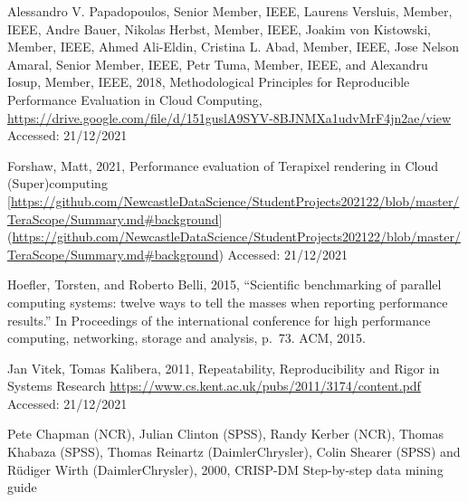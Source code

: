 \documentclass[
  twocolumn]{article}
\begin{document}
Alessandro V. Papadopoulos, Senior Member, IEEE, Laurens Versluis,
Member, IEEE, Andre Bauer, Nikolas Herbst, Member, IEEE, Joakim von
Kistowski, Member, IEEE, Ahmed Ali-Eldin, Cristina L. Abad, Member,
IEEE, Jose Nelson Amaral, Senior Member, IEEE, Petr Tuma, Member, IEEE,
and Alexandru Iosup, Member, IEEE, 2018, Methodological Principles for
Reproducible Performance Evaluation in Cloud Computing,
\url{https://drive.google.com/file/d/151guslA9SYV-8BJNMXa1udvMrF4jn2ae/view}
Accessed: 21/12/2021

Forshaw, Matt, 2021, Performance evaluation of Terapixel rendering in
Cloud (Super)computing
{[}\url{https://github.com/NewcastleDataScience/StudentProjects202122/blob/master/TeraScope/Summary.md\#background}{]}
(\url{https://github.com/NewcastleDataScience/StudentProjects202122/blob/master/TeraScope/Summary.md\#background})
Accessed: 21/12/2021

Hoefler, Torsten, and Roberto Belli, 2015, ``Scientific benchmarking of
parallel computing systems: twelve ways to tell the masses when
reporting performance results.'' In Proceedings of the international
conference for high performance computing, networking, storage and
analysis, p.~73. ACM, 2015.

Jan Vitek, Tomas Kalibera, 2011, Repeatability, Reproducibility and
Rigor in Systems Research
\url{https://www.cs.kent.ac.uk/pubs/2011/3174/content.pdf} Accessed:
21/12/2021

Pete Chapman (NCR), Julian Clinton (SPSS), Randy Kerber (NCR), Thomas
Khabaza (SPSS), Thomas Reinartz (DaimlerChrysler), Colin Shearer (SPSS)
and Rüdiger Wirth (DaimlerChrysler), 2000, CRISP-DM Step-by-step data
mining guide
\end{document}
